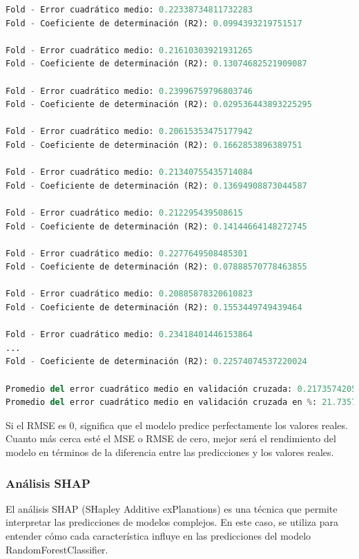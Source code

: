\begin{lstlisting}[language=Python, caption=Resultados Stratified K-Fold Cross-Validation en los datos de entrenamiento, label=lst:res_skfold_train]
    Fold - Error cuadrático medio: 0.22338734811732283
Fold - Coeficiente de determinación (R2): 0.0994393219751517

Fold - Error cuadrático medio: 0.21610303921931265
Fold - Coeficiente de determinación (R2): 0.13074682521909087

Fold - Error cuadrático medio: 0.23996759796803746
Fold - Coeficiente de determinación (R2): 0.029536443893225295

Fold - Error cuadrático medio: 0.20615353475177942
Fold - Coeficiente de determinación (R2): 0.1662853896389751

Fold - Error cuadrático medio: 0.21340755435714084
Fold - Coeficiente de determinación (R2): 0.13694908873044587

Fold - Error cuadrático medio: 0.212295439508615
Fold - Coeficiente de determinación (R2): 0.14144664148272745

Fold - Error cuadrático medio: 0.2277649508485301
Fold - Coeficiente de determinación (R2): 0.07888570778463855

Fold - Error cuadrático medio: 0.20885878320610823
Fold - Coeficiente de determinación (R2): 0.1553449749439464

Fold - Error cuadrático medio: 0.23418401446153864
...
Fold - Coeficiente de determinación (R2): 0.22574074537220024

Promedio del error cuadrático medio en validación cruzada: 0.21735742055519647
Promedio del error cuadrático medio en validación cruzada en %: 21.735742055519648
\end{lstlisting}

Si el RMSE es 0, significa que el modelo predice perfectamente los valores reales. Cuanto más cerca esté el MSE o RMSE de cero, mejor será el rendimiento del modelo en términos de la diferencia entre las predicciones y los valores reales.

\subsubsection{Análisis SHAP}

El análisis SHAP (SHapley Additive exPlanations) es una técnica que permite interpretar las predicciones de modelos complejos. En este caso, se utiliza para entender cómo cada característica influye en las predicciones del modelo RandomForestClassifier.

